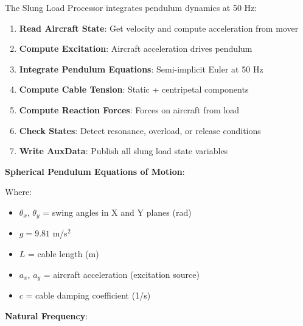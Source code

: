 \unclass The Slung Load Processor integrates pendulum dynamics at 50 Hz:

\begin{enumerate}
	\item \unclass \textbf{Read Aircraft State}: Get velocity and compute acceleration from mover
	\item \unclass \textbf{Compute Excitation}: Aircraft acceleration drives pendulum
	\item \unclass \textbf{Integrate Pendulum Equations}: Semi-implicit Euler at 50 Hz
	\item \unclass \textbf{Compute Cable Tension}: Static + centripetal components
	\item \unclass \textbf{Compute Reaction Forces}: Forces on aircraft from load
	\item \unclass \textbf{Check States}: Detect resonance, overload, or release conditions
	\item \unclass \textbf{Write AuxData}: Publish all slung load state variables
\end{enumerate}

\unclass \textbf{Spherical Pendulum Equations of Motion}:


\unclass Where:
\begin{itemize}
	\item \unclass $\theta_x$, $\theta_y$ = swing angles in X and Y planes (rad)
	\item \unclass $g = 9.81$ m/s$^2$
	\item \unclass $L$ = cable length (m)
	\item \unclass $a_x$, $a_y$ = aircraft acceleration (excitation source)
	\item \unclass $c$ = cable damping coefficient (1/s)
\end{itemize}

\unclass \textbf{Natural Frequency}:


